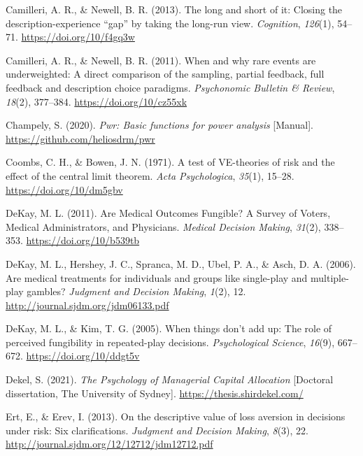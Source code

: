 \documentclass[
  english,
  man, donotrepeattitle,floatsintext]{apa7}
\newlength{\cslhangindent}
\newenvironment{cslreferences}%
  {\setlength{\parindent}{0pt}%
  \everypar{\setlength{\hangindent}{\cslhangindent}}\ignorespaces}%
  {\par}
\theoremstyle{definition}
\theoremstyle{definition}
\theoremstyle{definition}
\theoremstyle{definition}
\theoremstyle{remark}
\begin{document}
\begin{cslreferences}
\leavevmode\hypertarget{ref-camilleri2013}{}%
Camilleri, A. R., \& Newell, B. R. (2013). The long and short of it: Closing the description-experience ``gap'' by taking the long-run view. \emph{Cognition}, \emph{126}(1), 54--71. \url{https://doi.org/10/f4gq3w}

\leavevmode\hypertarget{ref-camilleri2011}{}%
Camilleri, A. R., \& Newell, B. R. (2011). When and why rare events are underweighted: A direct comparison of the sampling, partial feedback, full feedback and description choice paradigms. \emph{Psychonomic Bulletin \& Review}, \emph{18}(2), 377--384. \url{https://doi.org/10/cz55xk}

\leavevmode\hypertarget{ref-champely2020}{}%
Champely, S. (2020). \emph{Pwr: Basic functions for power analysis} {[}Manual{]}. \url{https://github.com/heliosdrm/pwr}

\leavevmode\hypertarget{ref-coombs1971}{}%
Coombs, C. H., \& Bowen, J. N. (1971). A test of VE-theories of risk and the effect of the central limit theorem. \emph{Acta Psychologica}, \emph{35}(1), 15--28. \url{https://doi.org/10/dm5gbv}

\leavevmode\hypertarget{ref-dekay2011}{}%
DeKay, M. L. (2011). Are Medical Outcomes Fungible? A Survey of Voters, Medical Administrators, and Physicians. \emph{Medical Decision Making}, \emph{31}(2), 338--353. \url{https://doi.org/10/b539tb}

\leavevmode\hypertarget{ref-dekay2006}{}%
DeKay, M. L., Hershey, J. C., Spranca, M. D., Ubel, P. A., \& Asch, D. A. (2006). Are medical treatments for individuals and groups like single-play and multiple-play gambles? \emph{Judgment and Decision Making}, \emph{1}(2), 12. \url{http://journal.sjdm.org/jdm06133.pdf}

\leavevmode\hypertarget{ref-dekay2005}{}%
DeKay, M. L., \& Kim, T. G. (2005). When things don't add up: The role of perceived fungibility in repeated-play decisions. \emph{Psychological Science}, \emph{16}(9), 667--672. \url{https://doi.org/10/ddgt5v}

\leavevmode\hypertarget{ref-dekel2021b}{}%
Dekel, S. (2021). \emph{The Psychology of Managerial Capital Allocation} {[}Doctoral dissertation, The University of Sydney{]}. \url{https://thesis.shirdekel.com/}

\leavevmode\hypertarget{ref-ert2013}{}%
Ert, E., \& Erev, I. (2013). On the descriptive value of loss aversion in decisions under risk: Six clarifications. \emph{Judgment and Decision Making}, \emph{8}(3), 22. \url{http://journal.sjdm.org/12/12712/jdm12712.pdf}


\end{cslreferences}
\end{document}
